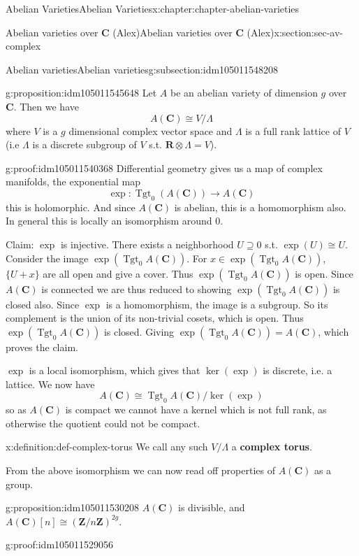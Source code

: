 \documentclass[oneside,10pt,]{book}
\newcommand{\terminology}[1]{\textbf{#1}}
\numberwithin{equation}{section}
\newcommand{\lb}{[}
\newcommand{\rb}{]}
\newcommand{\ZZ}{\mathbf{Z}}
\newcommand{\RR}{\mathbf{R}}
\newcommand{\CC}{\mathbf{C}}
\DeclareMathOperator{\Tgt}{Tgt}
\begin{document}
\begin{chapterptx}{Abelian Varieties}{}{Abelian Varieties}{}{}{x:chapter:chapter-abelian-varieties}
\begin{sectionptx}{Abelian varieties over \(\CC\) (Alex)}{}{Abelian varieties over \(\CC\) (Alex)}{}{}{x:section:sec-av-complex}
\begin{subsectionptx}{Abelian varieties}{}{Abelian varieties}{}{}{g:subsection:idm105011548208}
\begin{proposition}{}{}{g:proposition:idm105011545648}
Let \(A\) be an abelian variety of dimension \(g\) over \(\CC\). Then we have%
\begin{equation*}
A(\CC) \cong V/\Lambda
\end{equation*}
where \(V\) is a \(g\) dimensional complex vector space and \(\Lambda\) is a full rank lattice of \(V\) (i.e \(\Lambda\) is a discrete subgroup of \(V\) s.t. \(\RR\otimes \Lambda  = V\)).%
\end{proposition}
\begin{proofptx}{}{g:proof:idm105011540368}
Differential geometry gives us a map of complex manifolds, the exponential map%
\begin{equation*}
\exp\colon\Tgt_0(A(\CC)) \to A(\CC)
\end{equation*}
this is holomorphic. And since \(A(\CC)\) is abelian, this is a homomorphism also. In general this is locally an isomorphism around 0.%
\par
Claim: \(\exp\) is injective. There exists a neighborhood \(U\supseteq 0\) s.t. \(\exp(U) \cong U\). Consider the image \(\exp(\Tgt_0 A(\CC))\). For \(x\in \exp(\Tgt_0 A(\CC))\), \(\{U+x\}\) are all open and give a cover. Thus \(\exp(\Tgt_0A(\CC))\) is open. Since \(A(\CC)\) is connected we are thus reduced to showing \(\exp(\Tgt_0 A(\CC))\) is closed also. Since \(\exp\) is a homomorphism, the image is a subgroup. So its complement is the union of its non-trivial cosets, which is open. Thus \(\exp(\Tgt_0A(\CC))\) is closed. Giving \(\exp(\Tgt_0A(\CC)) = A(\CC)\), which proves the claim.%
\par
\(\exp\) is a local isomorphism, which gives that \(\ker(\exp)\) is discrete, i.e. a lattice. We now have%
\begin{equation*}
A(\CC) \cong \Tgt_0A(\CC)/ \ker(\exp)
\end{equation*}
so as \(A(\CC)\) is compact we cannot have a kernel which is not full rank, as otherwise the quotient could not be compact.%
\end{proofptx}
\begin{definition}{}{x:definition:def-complex-torus}%
We call any such \(V/\Lambda\) a \terminology{complex torus}.%
\end{definition}
From the above isomorphism we can now read off properties of \(A(\CC)\) as a group.%
\begin{proposition}{}{}{g:proposition:idm105011530208}%
\(A(\CC)\) is divisible, and \(A(\CC)\lb n\rb \cong (\ZZ/n\ZZ)^{2g}\).%
\end{proposition}
\begin{proofptx}{}{g:proof:idm105011529056}

\end{proofptx}
\end{subsectionptx}
\end{sectionptx}
\end{chapterptx}
\end{document}
